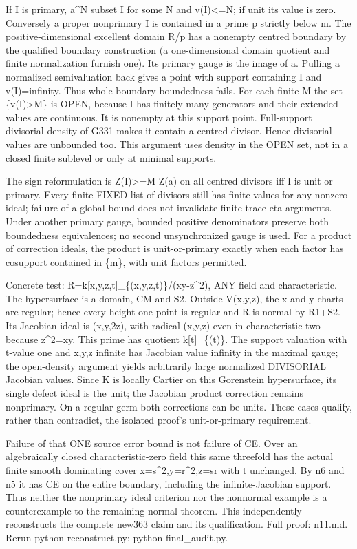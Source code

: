 \documentclass[11pt]{article}
\begin{document}
If I is primary, a\textasciicircum{}N subset I for some N and v(I)<=N; if unit its value is zero. Conversely a proper nonprimary I is contained in a prime p strictly below m. The positive-dimensional excellent domain R/p has a nonempty centred boundary by the qualified boundary construction (a one-dimensional domain quotient and finite normalization furnish one). Its primary gauge is the image of a. Pulling a normalized semivaluation back gives a point with support containing I and v(I)=infinity. Thus whole-boundary boundedness fails. For each finite M the set \{v(I)>M\} is OPEN, because I has finitely many generators and their extended values are continuous. It is nonempty at this support point. Full-support divisorial density of G331 makes it contain a centred divisor. Hence divisorial values are unbounded too. This argument uses density in the OPEN set, not in a closed finite sublevel or only at minimal supports.

The sign reformulation is Z(I)>=M Z(a) on all centred divisors iff I is unit or primary. Every finite FIXED list of divisors still has finite values for any nonzero ideal; failure of a global bound does not invalidate finite-trace eta arguments. Under another primary gauge, bounded positive denominators preserve both boundedness equivalences; no second unsynchronized gauge is used. For a product of correction ideals, the product is unit-or-primary exactly when each factor has cosupport contained in \{m\}, with unit factors permitted.

Concrete test: R=k[x,y,z,t]\_\{(x,y,z,t)\}/(xy-z\textasciicircum{}2), ANY field and characteristic. The hypersurface is a domain, CM and S2. Outside V(x,y,z), the x and y charts are regular; hence every height-one point is regular and R is normal by R1+S2. Its Jacobian ideal is (x,y,2z), with radical (x,y,z) even in characteristic two because z\textasciicircum{}2=xy. This prime has quotient k[t]\_\{(t)\}. The support valuation with t-value one and x,y,z infinite has Jacobian value infinity in the maximal gauge; the open-density argument yields arbitrarily large normalized DIVISORIAL Jacobian values. Since K is locally Cartier on this Gorenstein hypersurface, its single defect ideal is the unit; the Jacobian product correction remains nonprimary. On a regular germ both corrections can be units. These cases qualify, rather than contradict, the isolated proof's unit-or-primary requirement.

Failure of that ONE source error bound is not failure of CE. Over an algebraically closed characteristic-zero field this same threefold has the actual finite smooth dominating cover x=s\textasciicircum{}2,y=r\textasciicircum{}2,z=sr with t unchanged. By n6 and n5 it has CE on the entire boundary, including the infinite-Jacobian support. Thus neither the nonprimary ideal criterion nor the nonnormal example is a counterexample to the remaining normal theorem. This independently reconstructs the complete new363 claim and its qualification. Full proof: n11.md. Rerun python reconstruct.py; python final\_audit.py.
\end{document}
